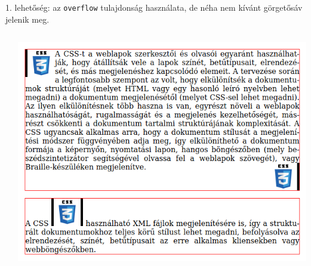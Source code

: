 \begin{frame}
  1. lehetőség: az \texttt{overflow} tulajdonság használata, de néha nem kívánt görgetősáv jelenik meg.
  \vfill
  \begin{columns}[c]
      \begin{exampleblock}{}
        \scriptsize
        
        
      \end{exampleblock}
      \includegraphics[width=\textwidth]{lebeg3.png}
  \end{columns}
\end{frame}

